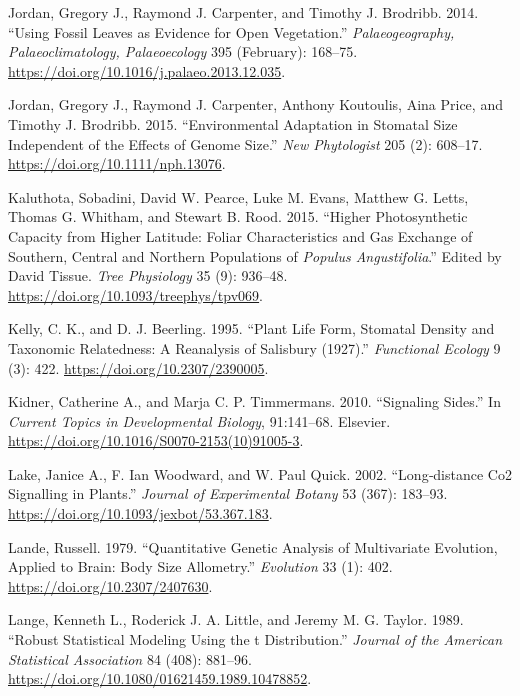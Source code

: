 \documentclass[
  12pt,
]{article}
\newlength{\cslhangindent}
\newlength{\cslentryspacingunit} %
\newenvironment{CSLReferences}[2] %
 {%
  \setlength{\parindent}{0pt}
  \ifodd #1
  \let\oldpar\par
  \def\par{\hangindent=\cslhangindent\oldpar}
  \fi
  \setlength{\parskip}{#2\cslentryspacingunit}
 }%
 {}
\begin{document}
\begin{CSLReferences}{1}{0}
\leavevmode{}%
Jordan, Gregory J., Raymond J. Carpenter, and Timothy J. Brodribb. 2014. {``Using Fossil Leaves as Evidence for Open Vegetation.''} \emph{Palaeogeography, Palaeoclimatology, Palaeoecology} 395 (February): 168--75. \url{https://doi.org/10.1016/j.palaeo.2013.12.035}.

\leavevmode{}%
Jordan, Gregory J., Raymond J. Carpenter, Anthony Koutoulis, Aina Price, and Timothy J. Brodribb. 2015. {``Environmental Adaptation in Stomatal Size Independent of the Effects of Genome Size.''} \emph{New Phytologist} 205 (2): 608--17. \url{https://doi.org/10.1111/nph.13076}.

\leavevmode{}%
Kaluthota, Sobadini, David W. Pearce, Luke M. Evans, Matthew G. Letts, Thomas G. Whitham, and Stewart B. Rood. 2015. {``Higher Photosynthetic Capacity from Higher Latitude: Foliar Characteristics and Gas Exchange of Southern, Central and Northern Populations of \emph{{Populus} Angustifolia}.''} Edited by David Tissue. \emph{Tree Physiology} 35 (9): 936--48. \url{https://doi.org/10.1093/treephys/tpv069}.

\leavevmode{}%
Kelly, C. K., and D. J. Beerling. 1995. {``Plant {Life} {Form}, {Stomatal} {Density} and {Taxonomic} {Relatedness}: {A} {Reanalysis} of {Salisbury} (1927).''} \emph{Functional Ecology} 9 (3): 422. \url{https://doi.org/10.2307/2390005}.

\leavevmode{}%
Kidner, Catherine A., and Marja C. P. Timmermans. 2010. {``Signaling {Sides}.''} In \emph{Current {Topics} in {Developmental} {Biology}}, 91:141--68. Elsevier. \url{https://doi.org/10.1016/S0070-2153(10)91005-3}.

\leavevmode{}%
Lake, Janice A., F. Ian Woodward, and W. Paul Quick. 2002. {``Long‐distance {Co2} Signalling in Plants.''} \emph{Journal of Experimental Botany} 53 (367): 183--93. \url{https://doi.org/10.1093/jexbot/53.367.183}.

\leavevmode{}%
Lande, Russell. 1979. {``Quantitative {Genetic} {Analysis} of {Multivariate} {Evolution}, {Applied} to {Brain}: {Body} {Size} {Allometry}.''} \emph{Evolution} 33 (1): 402. \url{https://doi.org/10.2307/2407630}.

\leavevmode{}%
Lange, Kenneth L., Roderick J. A. Little, and Jeremy M. G. Taylor. 1989. {``Robust {Statistical} {Modeling} {Using} the t {Distribution}.''} \emph{Journal of the American Statistical Association} 84 (408): 881--96. \url{https://doi.org/10.1080/01621459.1989.10478852}.


\end{CSLReferences}
\end{document}
